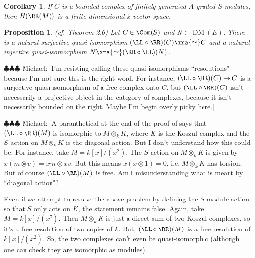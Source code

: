 \documentclass[12pt]{amsart}
\newtheorem{prop}[lemma]{Proposition}
\newtheorem{cor}[lemma]{Corollary}
\theoremstyle{definition}
\theoremstyle{remark}
\newcommand{\michael}[1]{{\color{red} \sf $\clubsuit\clubsuit\clubsuit$ Michael: [#1]}}
\def\DM{\operatorname{DM}}
\begin{document}
\begin{cor}\label{cor:RM high degree}
If $C$ is a bounded complex of finitely generated $A$-graded $S$-modules, then $H(\RR(M))$ is a finite dimensional $k$-vector space.
\end{cor}


\begin{prop}(cf. \cite{EFS} Theorem 2.6)
\label{resolutions}
Let $C \in \Com(S)$ and $N \in \DM(E)$. There is a natural surjective quasi-isomorphism $(\LL \circ \RR)(C) \xra{\simeq} C$ and a natural injective quasi-isomorphism $N \xra{\simeq} (\RR \circ \LL)(N)$.
\end{prop}

\michael{I'm resisting calling these quasi-isomorphisms ``resolutions", because I'm not sure this is the right word. For instance, $(\LL \circ \RR)(C) \to C$ is a surjective quasi-isomorphism of a free complex onto $C$, but $(\LL \circ \RR)(C)$ isn't necessarily a projective object in the category of complexes, because it isn't necessarily bounded on the right. Maybe I'm begin overly picky here.}

\michael{A paranthetical at the end of the proof of \cite[Theorem 2.6]{EFS} says that $(\LL \circ \RR)(M)$ is isomorphic to $M \otimes_k K$, where $K$ is the Koszul complex and the $S$-action on $M \otimes_k K$ is the diagonal action. But I don't understand how this could be. For instance, take $M = k[x]/(x^2)$. The $S$-action on $M \otimes_k K$ is given by $x(m \otimes v) = xm \otimes xv$. But this means $x (x \otimes 1) = 0$, i.e. $M \otimes_k K$ has torsion. But of course $(\LL \circ \RR)(M)$ is free. Am I misunderstanding what is meant by ``diagonal action"?

Even if we attempt to resolve the above problem by defining the $S$-module action so that $S$ only acts on $K$, the statement remains false. Again, take $M = k[x]/(x^2)$. Then $M \otimes_k K$ is just a direct sum of two Koszul complexes, so it's a free resolution of two copies of $k$. But, $(\LL \circ \RR) (M)$ is a free resolution of $k[x]/(x^2)$. So, the two complexes can't even be quasi-isomorphic (although one can check they are isomorphic as modules).}
\end{document}
